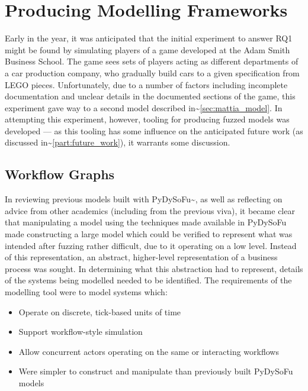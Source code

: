 \documentclass[11pt]{article}
\begin{document}
\section{Producing Modelling Frameworks}
\label{sec:org4b04f48}

Early in the year, it was anticipated that the initial experiment to answer RQ1
might be found by simulating players of a game developed at the Adam Smith
Business School. The game sees sets of players acting as different departments
of a car production company, who gradually build cars to a given specification
from LEGO pieces\cite{qpq_game}. Unfortunately, due to a number of factors
including incomplete documentation and unclear details in the documented
sections of the game, this experiment gave way to a second model described
in\textasciitilde{}\cref{sec:mattia_model}. In attempting this experiment, however, tooling for
producing fuzzed models was developed --- as this tooling has some influence on
the anticipated future work (as discussed in\textasciitilde{}\cref{part:future_work}), it
warrants some discussion.

\subsection{Workflow Graphs}
\label{sec:org841b5a7}
\label{subsec:workflow_graphs}

In reviewing previous models built with PyDySoFu\textasciitilde{}\cite{pdsf_paper}, as well as
reflecting on advice from other academics (including from the previous viva), it
became clear that manipulating a model using the techniques made available in
PyDySoFu made constructing a large model which could be verified to represent
what was intended after fuzzing rather difficult, due to it operating on a low
level. Instead of this representation, an abstract, higher-level representation
of a business process was sought. In determining what this abstraction had to
represent, details of the systems being modelled needed to be identified. The
requirements of the modelling tool were to model systems which:

\begin{itemize}
\item Operate on discrete, tick-based units of time
\item Support workflow-style simulation
\item Allow concurrent actors operating on the same or interacting workflows
\item Were simpler to construct and manipulate than previously built PyDySoFu models
\end{itemize}
\end{document}
